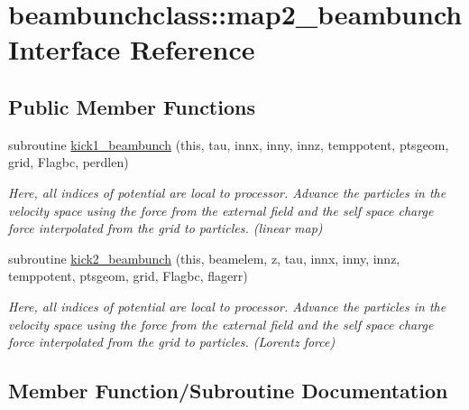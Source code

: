 \hypertarget{interfacebeambunchclass_1_1map2__beambunch}{}\section{beambunchclass\+::map2\+\_\+beambunch Interface Reference}
\label{interfacebeambunchclass_1_1map2__beambunch}
\subsection*{Public Member Functions}
\begin{DoxyCompactItemize}
\item 
subroutine \mbox{\hyperlink{interfacebeambunchclass_1_1map2__beambunch_aa53ac5bb063bfef5bb11d02107e8039d}{kick1\+\_\+beambunch}} (this, tau, innx, inny, innz, temppotent, ptsgeom, grid, Flagbc, perdlen)
\begin{DoxyCompactList}\small\item\em Here, all indices of potential are local to processor. Advance the particles in the velocity space using the force from the external field and the self space charge force interpolated from the grid to particles. (linear map) \end{DoxyCompactList}\item 
subroutine \mbox{\hyperlink{interfacebeambunchclass_1_1map2__beambunch_ad5a7cb4186086859c10a4ac8a1ad1fe8}{kick2\+\_\+beambunch}} (this, beamelem, z, tau, innx, inny, innz, temppotent, ptsgeom, grid, Flagbc, flagerr)
\begin{DoxyCompactList}\small\item\em Here, all indices of potential are local to processor. Advance the particles in the velocity space using the force from the external field and the self space charge force interpolated from the grid to particles. (Lorentz force) \end{DoxyCompactList}\end{DoxyCompactItemize}


\subsection{Member Function/\+Subroutine Documentation}
\mbox{\label{interfacebeambunchclass_1_1map2__beambunch_aa53ac5bb063bfef5bb11d02107e8039d}} 
